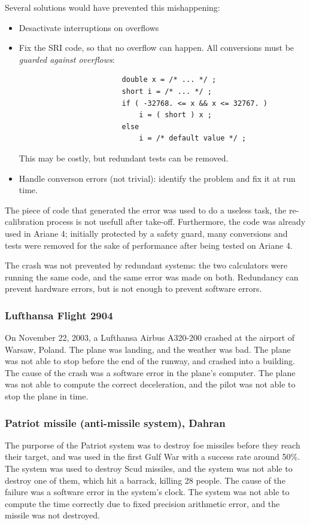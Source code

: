 \documentclass[toc, titlepaged]{../cs-classes/cs-classes}
\begin{document}
Several solutions would have prevented this mishappening:
\begin{itemize}
    \item Desactivate interruptions on overflows
    \item Fix the SRI code, so that no overflow can happen. All conversions must be \emph{guarded against overflows}:
    \begin{verbatim}
                        double x = /* ... */ ;
                        short i = /* ... */ ;
                        if ( -32768. <= x && x <= 32767. )
                            i = ( short ) x ;
                        else
                            i = /* default value */ ;
    \end{verbatim}
    This may be costly, but redundant tests can be removed.
    \item Handle converson errors (not trivial): identify the problem and fix it at run time.
\end{itemize}

The piece of code that generated the error was used to do a useless task, the re-calibration process is not usefull after take-off. Furthermore, the code was already used in Ariane 4; initially protected by a safety guard, many conversions and tests were removed for the sake of performance after being tested on Ariane 4.

The crash was not prevented by redundant systems: the two calculators were running the same code, and the same error was made on both. Redundancy can prevent hardware errors, but is not enough to prevent software errors.

\subsubsection{Lufthansa Flight 2904}
On November 22, 2003, a Lufthansa Airbus A320-200 crashed at the airport of Warsaw, Poland. The plane was landing, and the weather was bad. The plane was not able to stop before the end of the runway, and crashed into a building. The cause of the crash was a software error in the plane's computer. The plane was not able to compute the correct deceleration, and the pilot was not able to stop the plane in time.

\subsubsection{Patriot missile (anti-missile system), Dahran}
The purporse of the Patriot system was to destroy foe missiles before they reach their target, and was used in the first Gulf War with a success rate around 50\%. The system was used to destroy Scud missiles, and the system was not able to destroy one of them, which hit a barrack, killing 28 people. The cause of the failure was a software error in the system's clock. The system was not able to compute the time correctly due to fixed precision arithmetic error, and the missile was not destroyed.
\end{document}
